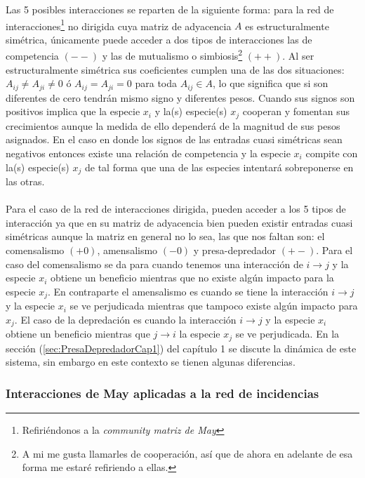 Las 5 posibles interacciones se reparten de la siguiente forma: para la red de interacciones\footnote{Refiriéndonos a la \textit{community matriz de May}} no dirigida cuya matriz de adyacencia $A$ es estructuralmente simétrica, únicamente puede acceder a dos tipos de interacciones las de competencia $(--)$ y las de mutualismo o simbiosis\footnote{A mi me gusta llamarles de cooperación, así que de ahora en adelante de esa forma me estaré refiriendo a ellas.} $(++)$. Al ser estructuralmente simétrica sus coeficientes cumplen una de las dos situaciones: $A_{ij}\neq A_{ji}\neq 0$ ó $A_{ij}=A_{ji}=0$ para toda $A_{ij}\in A$, lo que significa que si son diferentes de cero tendrán mismo signo y diferentes pesos. Cuando sus signos son positivos implica que la especie $x_i$ y la(s) especie(s) $x_j$ cooperan y fomentan sus crecimientos aunque la medida de ello dependerá de la magnitud de sus pesos asignados. En el caso en donde los signos de las entradas cuasi simétricas sean negativos entonces existe una relación de competencia y la especie $x_i$ compite con la(s) especie(s) $x_j$ de tal forma que una de las especies intentará sobreponerse en las otras. 
\\
\\
Para el caso de la red de interacciones dirigida, pueden acceder a los 5 tipos de interacción ya que en su matriz de adyacencia bien pueden existir entradas cuasi simétricas aunque la matriz en general no lo sea, las que nos faltan son: el comensalismo $(+0)$, amensalismo $(-0)$ y presa-depredador $(+-)$. Para el caso del comensalismo se da para cuando tenemos una interacción de $i\to j$ y la especie $x_i$ obtiene un beneficio mientras que no existe algún impacto para la especie $x_j$. En contraparte el amensalismo es cuando se tiene la interacción $i\to j$ y la especie $x_i$ se ve perjudicada mientras que tampoco existe algún impacto para $x_j$. El caso de la depredación es cuando la interacción $i\to j$ y la especie $x_i$ obtiene un beneficio mientras que $j\to i$ la especie $x_j$ se ve perjudicada. En la sección (\ref{sec:PresaDepredadorCap1}) del capítulo 1 se discute la dinámica de este sistema, sin embargo en este contexto se tienen algunas diferencias. 

\subsubsection*{Interacciones de May aplicadas a la red de incidencias}

